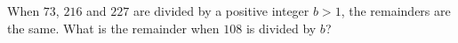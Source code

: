 When $73$, $216$ and $227$ are divided by a positive integer $b>1$, the remainders are the same. What is the remainder when $108$ is divided by $b$?

